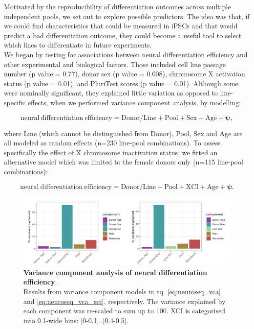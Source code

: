 Motivated by the reproducibility of differentiation outcomes across multiple independent pools, we set out to explore possible predictors.
The idea was that, if we could find characteristics that could be measured in iPSCs and that would predict 
a bad differentiation outcome, they could become a 
useful tool to select which lines to differentiate in future experiments.\\

We began by testing for associations between neural differentiation efficiency and other experimental and biological factors.
Those included cell line passage number (p value = 0.77), donor sex (p value = 0.008), chromosome X activation status (p value = 0.01), and PluriTest scores \cite{muller2011bioinformatic} (p value = 0.01).
Although some were nominally significant, they explained little variation as opposed to line-specific effects, when we performed variance component analysis, by modelling:

\begin{equation}\label{eq:neuroseq_vca}
    \mathrm{neural \ differentiation \ efficiency = Donor/Line + Pool + Sex + Age + \boldsymbol{\psi}},
\end{equation}

where Line (which cannot be distinguished from Donor), Pool, Sex and Age are all modeled as random effects (n=230 line-pool combinations).
To assess specifically the effect of X chromosome inactivation status, we fitted an alternative model which was limited to the female donors only (n=115 line-pool combinations):

\begin{equation}\label{eq:neuroseq_vca_xci}
    \mathrm{neural \ differentiation \ efficiency = Donor/Line + Pool + XCI + Age + \boldsymbol{\psi}}. 
\end{equation}

\begin{figure}[htbp]
\centering
\includegraphics[width=16cm]{Chapter5/Fig/neuroseq_diff_eff_vca.png}
\caption[Variance component analysis of neural differentiation efficiency]{\textbf{Variance component analysis of neural differentiation efficiency}.\\
Results from variance component models in eq. \eqref{eq:neuroseq_vca} and \eqref{eq:neuroseq_vca_xci}, respectively.
The variance explained by each component was re-scaled to sum up to 100.
XCI is categorised into 0.1-wide bins: [0-0.1]..[0.4-0.5].}
\label{fig:neuroseq_diff_eff_vca}
\end{figure}

